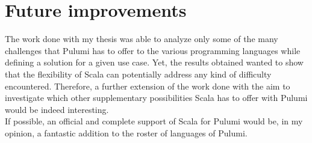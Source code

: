 \section{Future improvements}
The work done with my thesis was able to analyze only some of the many challenges that Pulumi has to offer to the various programming languages while defining a solution for a given use case.
Yet, the results obtained wanted to show that the flexibility of Scala can potentially address any kind of difficulty encountered.
Therefore, a further extension of the work done with the aim to investigate which other supplementary possibilities Scala has to offer with Pulumi would be indeed interesting.\\
If possible, an official and complete support of Scala for Pulumi would be, in my opinion, a fantastic addition to the roster of languages of Pulumi.


